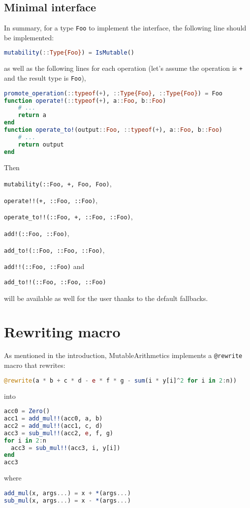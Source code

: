 \documentclass{juliacon}
\newcommand{\ma}{MutableArithmetics}
\begin{document}
\subsection{Minimal interface}
In summary, for a type \lstinline|Foo| to implement the interface,
the following line should be implemented:
\begin{lstlisting}[language = Julia]
mutability(::Type{Foo}) = IsMutable()
\end{lstlisting}
as well as the following lines for each operation
(let's assume the operation is \lstinline|+|
and the result type is \lstinline|Foo|),
\begin{lstlisting}[language = Julia]
promote_operation(::typeof(+), ::Type{Foo}, ::Type{Foo}) = Foo
function operate!(::typeof(+), a::Foo, b::Foo)
    # ...
    return a
end
function operate_to!(output::Foo, ::typeof(+), a::Foo, b::Foo)
    # ...
    return output
end
\end{lstlisting}
Then
\begin{unnumlist}
  \item \lstinline|mutability(::Foo, +, Foo, Foo)|,
  \item \lstinline|operate!!(+, ::Foo, ::Foo)|,
  \item \lstinline|operate_to!!(::Foo, +, ::Foo, ::Foo)|,
  \item \lstinline|add!(::Foo, ::Foo)|,
  \item \lstinline|add_to!(::Foo, ::Foo, ::Foo)|,
  \item \lstinline|add!!(::Foo, ::Foo)| and
  \item \lstinline|add_to!!(::Foo, ::Foo, ::Foo)|
\end{unnumlist}
will be available as well for the user thanks to the default fallbacks.

\section{Rewriting macro}

As mentioned in the introduction, \ma{} implements a \lstinline|@rewrite| macro that rewrites:
\begin{lstlisting}[language = Julia]
@rewrite(a * b + c * d - e * f * g - sum(i * y[i]^2 for i in 2:n))
\end{lstlisting}
into
\begin{lstlisting}[language = Julia]
acc0 = Zero()
acc1 = add_mul!!(acc0, a, b)
acc2 = add_mul!!(acc1, c, d)
acc3 = sub_mul!!(acc2, e, f, g)
for i in 2:n
  acc3 = sub_mul!!(acc3, i, y[i])
end
acc3
\end{lstlisting}
where
\begin{lstlisting}[language = Julia]
add_mul(x, args...) = x + *(args...)
sub_mul(x, args...) = x - *(args...)
\end{lstlisting}
\end{document}
